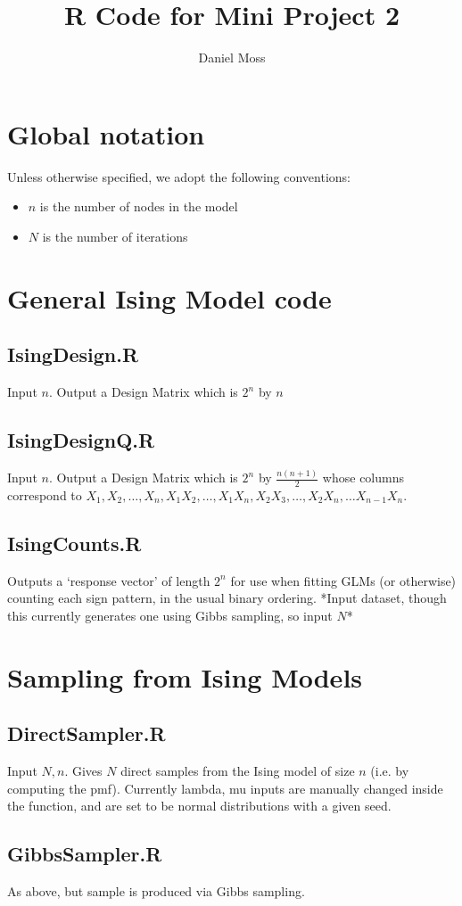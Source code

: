 \documentclass{article}
\title{R Code for Mini Project 2}
\author{Daniel Moss}
\theoremstyle{plain}
\theoremstyle{definition}
\theoremstyle{plain} %
\begin{document}
\maketitle
\section{Global notation}
Unless otherwise specified, we adopt the following conventions:
\begin{itemize}
	\item $n$ is the number of nodes in the model
	\item $N$ is the number of iterations
\end{itemize}

\section{General Ising Model code}
\subsection{IsingDesign.R}
Input $n$. Output a Design Matrix which is $2^n$ by $n$
\subsection{IsingDesignQ.R}
Input $n$. Output a Design Matrix which is $2^n$ by $\frac{n(n+1)}{2}$ whose columns correspond to  $X_1,X_2,\dots,X_n,X_1X_2,\dots,X_1X_n,X_2X_3,\dots,X_2X_n,\dots X_{n-1}X_n$.
\subsection{IsingCounts.R}
Outputs a `response vector' of length $2^n$ for use when fitting GLMs (or otherwise) counting each sign pattern, in the usual binary ordering. *Input dataset, though this currently generates one using Gibbs sampling, so input $N$*
\section{Sampling from Ising Models}
\subsection{DirectSampler.R}
Input $N,n$. Gives $N$ direct samples from the Ising model of size $n$ (i.e. by computing the pmf). Currently lambda, mu inputs are manually changed inside the function, and are set to be normal distributions with a given seed.
\subsection{GibbsSampler.R}
As above, but sample is produced via Gibbs sampling.
\end{document}
